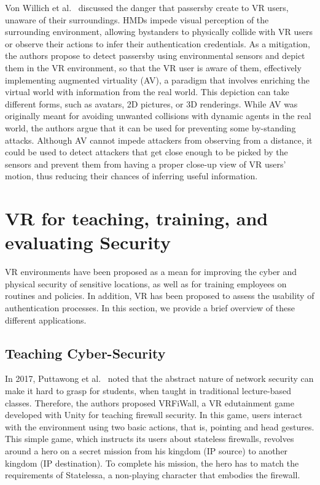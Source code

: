 \documentclass[journal]{IEEEtran}
\begin{document}
Von Willich et al.~\cite{vonwillich2019} discussed the danger that passersby create to VR users, unaware of their surroundings. HMDs impede visual perception of the surrounding environment, allowing bystanders to physically collide with VR users or observe their actions to infer their authentication credentials. As a mitigation, the authors propose to detect passersby using environmental sensors and depict them in the VR environment, so that the VR user is aware of them, effectively implementing augmented virtuality (AV), a paradigm that involves enriching the virtual world with information from the real world. This depiction can take different forms, such as avatars, 2D pictures, or 3D renderings. While AV was originally meant for avoiding unwanted collisions with dynamic agents in the real world, the authors argue that it can be used for preventing some by-standing attacks. Although AV cannot impede attackers from observing from a distance, it could be used to detect attackers that get close enough to be picked by the sensors and prevent them from having a proper close-up view of VR users' motion, thus reducing their chances of inferring useful information.



\section{VR for teaching, training, and evaluating Security}\label{sec:teach_train_ev}
VR environments have been proposed as a mean for improving the cyber and physical security of sensitive locations, as well as for training employees on routines and policies. In addition, VR has been proposed to assess the usability of authentication processes. In this section, we provide a brief overview of these different applications.

\subsection{Teaching Cyber-Security}
In 2017, Puttawong et al.~\cite{puttawong2017} noted that the abstract nature of network security can make it hard to grasp for students, when taught in traditional lecture-based classes. Therefore, the authors proposed VRFiWall, a VR edutainment game developed with Unity for teaching firewall security. In this game, users interact with the environment using two basic actions, that is, pointing and head gestures. This simple game, which instructs its users about stateless firewalls, revolves around a hero on a secret mission from his kingdom (IP source) to another kingdom (IP destination). To complete his mission, the hero has to match the requirements of Statelessa, a non-playing character that embodies the firewall.
\end{document}
